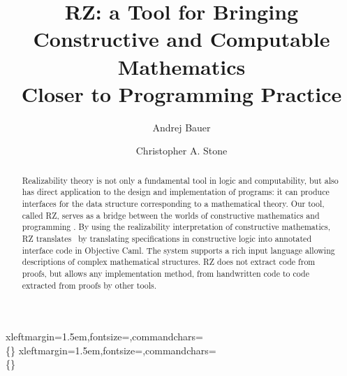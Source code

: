 \usepackage{amsmath}
\usepackage{amssymb}
\usepackage{graphicx}
\usepackage{fancyvrb}
\usepackage{url}




%

\iflong
\newcommand{\sourcefile}[1]{%
\VerbatimInput[xleftmargin=1.5em,fontsize=\footnotesize]{#1}}
\else %
\newcommand{\sourcefile}[1]{%
\VerbatimInput[xleftmargin=1.5em,fontsize=\footnotesize]{#1}}
\fi %

\newcommand{\sourcefilex}[1]{%
\VerbatimInput[xleftmargin=1.5em,fontsize=\scriptsize]{#1}}

\iflong
{}%
{xleftmargin=1.5em,fontsize=\footnotesize,commandchars=\\\{\}}
\else
{}%
{xleftmargin=1.5em,fontsize=\footnotesize,commandchars=\\\{\}}
\fi




\title{RZ: a Tool for Bringing\\
  Constructive and Computable Mathematics\\
  Closer to Programming Practice}
\author{
  Andrej Bauer \and
  Christopher A. Stone}

\maketitle

\begin{abstract}
  Realizability theory 
\iflong 
  is not only a fundamental tool in logic
  and computability, but also 
  has direct application to the design and
  implementation of programs: it
\fi %
  can produce interfaces for the data
  structure corresponding to a
  mathematical theory.
%
  Our tool, called RZ,
  serves as a bridge between
\iflong the worlds of \fi
  constructive
  mathematics and programming%
\iflong 
.
By using the realizability
  interpretation of constructive mathematics, RZ 
  translates
\else
\ by translating
\fi %
  specifications in constructive logic into annotated
  interface code in Objective Caml.
%
  The system supports
  a rich input language allowing descriptions of
  complex mathematical structures. RZ does not extract code from
  proofs, but allows any implementation method, from handwritten code to code extracted from
  proofs by other tools.
\end{abstract}

